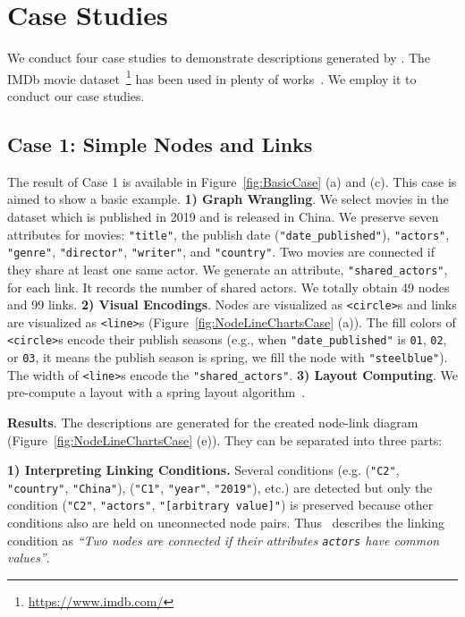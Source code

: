 \section{Case Studies}
We conduct four case studies to demonstrate descriptions generated by \ApproachName.
The IMDb movie dataset~\footnote{\url{https://www.imdb.com/}} has been used in plenty of works~\cite{DBLP:journals/tvcg/SrinivasanPEB18, DBLP:journals/pvldb/KrishnanWWFG16, DBLP:conf/ieeevast/BigelowNML19}.
We employ it to conduct our case studies.


\subsection{Case 1: Simple Nodes and Links}\label{sec:imdb_movies}
The result of Case 1 is available in Figure~\ref{fig:BasicCase} (a) and (c).
This case is aimed to show a basic example.
\textbf{1) Graph Wrangling}. We select movies in the dataset which is published in 2019 and is released in China.
We preserve seven attributes for movies: \texttt{"title"}, the publish date (\texttt{"date\_published"}), \texttt{"actors"}, \texttt{"genre"}, \texttt{"director"}, \texttt{"writer"}, and \texttt{"country"}.
Two movies are connected if they share at least one same actor.
We generate an attribute, \texttt{"shared\_actors"}, for each link. 
It records the number of shared actors.
We totally obtain 49 nodes and 99 links.
\textbf{2) Visual Encodings}. 
Nodes are visualized as \texttt{<circle>}s and links are visualized as \texttt{<line>}s (Figure~\ref{fig:NodeLineChartsCase} (a)).
The fill colors of \texttt{<circle>}s encode their publish seasons (e.g., when \texttt{"date\_published"} is \texttt{01}, \texttt{02}, or \texttt{03}, it means the publish season is spring, we fill the node with \texttt{"steelblue"}).
The width of \texttt{<line>}s encode the \texttt{"shared\_actors"}.
\textbf{3) Layout Computing}. 
We pre-compute a layout with a spring layout algorithm~\cite{DBLP:journals/spe/FruchtermanR91}.

\textbf{Results}.
The descriptions are generated for the created node-link diagram (Figure~\ref{fig:NodeLineChartsCase} (e)).
They can be separated into three parts:

\textbf{1) Interpreting Linking Conditions.} Several conditions (e.g. (\texttt{"C2"}, \texttt{"country"}, \texttt{"China"}), (\texttt{"C1"}, \texttt{"year"}, \texttt{"2019"}), etc.) are detected but only the condition (\texttt{"C2"}, \texttt{"actors"}, \texttt{"[arbitrary value]"}) is preserved because other conditions also are held on unconnected node pairs.
Thus \ApproachName~describes the linking condition as \textit{``Two nodes are connected if their attributes {\texttt{actors}} have common values''}.

